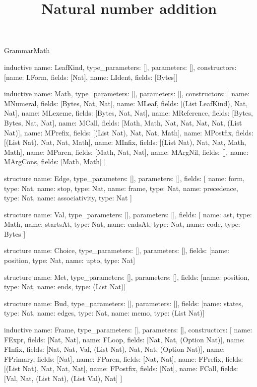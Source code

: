 \begin{lexlean}{GrammarMath}
\title{Natural number addition}
\begin{semanticmodule}
inductive{
  name: LeafKind,
  type_parameters: [],
  parameters: [],
  constructors: [{name: LForm, fields: [Nat]}, {name: LIdent, fields: [Bytes]}]
}

inductive{
  name: Math,
  type_parameters: [],
  parameters: [],
  constructors: [
    {name: MNumeral, fields: [Bytes, Nat, Nat]},
    {name: MLeaf, fields: [(List LeafKind), Nat, Nat]},
    {name: MLexeme, fields: [Bytes, Nat, Nat]},
    {name: MReference, fields: [Bytes, Bytes, Nat, Nat]},
    {name: MCall, fields: [Math, Math, Nat, Nat, Nat, Nat, (List Nat)]},
    {name: MPrefix, fields: [(List Nat), Nat, Nat, Math]},
    {name: MPostfix, fields: [(List Nat), Nat, Nat, Math]},
    {name: MInfix, fields: [(List Nat), Nat, Nat, Math, Math]},
    {name: MParen, fields: [Math, Nat, Nat]},
    {name: MArgNil, fields: []},
    {name: MArgCons, fields: [Math, Math]}
  ]
}

structure{
  name: Edge,
  type_parameters: [],
  parameters: [],
  fields: [
    {name: form, type: Nat},
    {name: stop, type: Nat},
    {name: frame, type: Nat},
    {name: precedence, type: Nat},
    {name: associativity, type: Nat}
  ]
}

structure{
  name: Val,
  type_parameters: [],
  parameters: [],
  fields: [
    {name: ast, type: Math},
    {name: startsAt, type: Nat},
    {name: endsAt, type: Nat},
    {name: code, type: Bytes}
  ]
}

structure{
  name: Choice,
  type_parameters: [],
  parameters: [],
  fields: [{name: position, type: Nat}, {name: upto, type: Nat}]
}

structure{
  name: Met,
  type_parameters: [],
  parameters: [],
  fields: [{name: position, type: Nat}, {name: ends, type: (List Nat)}]
}

structure{
  name: Bud,
  type_parameters: [],
  parameters: [],
  fields: [{name: states, type: Nat}, {name: edges, type: Nat}, {name: memo, type: (List Nat)}]
}

inductive{
  name: Frame,
  type_parameters: [],
  parameters: [],
  constructors: [
    {name: FExpr, fields: [Nat, Nat]},
    {name: FLoop, fields: [Nat, Nat, (Option Nat)]},
    {name: FInfix, fields: [Nat, Nat, Val, (List Nat), Nat, Nat, (Option Nat)]},
    {name: FPrimary, fields: [Nat]},
    {name: FParen, fields: [Nat, Nat]},
    {name: FPrefix, fields: [(List Nat), Nat, Nat, Nat]},
    {name: FPostfix, fields: [Nat]},
    {name: FCall, fields: [Val, Nat, (List Nat), (List Val), Nat]}
  ]
}


\end{semanticmodule}
\end{lexlean}
